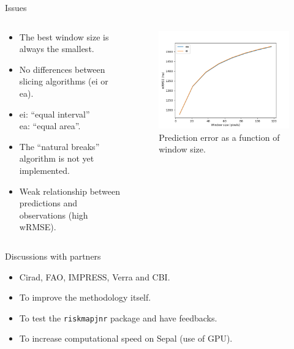 \documentclass[10pt,table,dvipsnames,compress]{beamer}
\begin{document}
\begin{frame}[label={sec:orgd8ddc1c}]{Issues}
\begin{columns}
\begin{column}{0.5\columnwidth}
\begin{itemize}
\item The best window size is always the smallest.
\item No differences between slicing algorithms (ei or ea).
\item ei: ``equal interval''\\
ea: ``equal area''.
\item The ``natural breaks'' algorithm is not yet implemented.
\item Weak relationship between predictions and observations (high wRMSE).
\end{itemize}
\end{column}

\begin{column}{0.5\columnwidth}
\begin{figure}[htbp]
\centering
\includegraphics[width=\textwidth]{figs/map_comp.png}
\caption{\label{fig:org2f4984a}Prediction error as a function of window size.}
\end{figure}
\end{column}
\end{columns}
\end{frame}

\begin{frame}[label={sec:orgbe9f803},fragile]{Discussions with partners}
 \begin{itemize}
\item Cirad, FAO, IMPRESS, Verra and CBI.
\item To improve the methodology itself.
\item To test the \texttt{riskmapjnr} package and have feedbacks.
\item To increase computational speed on Sepal (use of GPU).
\end{itemize}
\end{frame}
\end{document}
